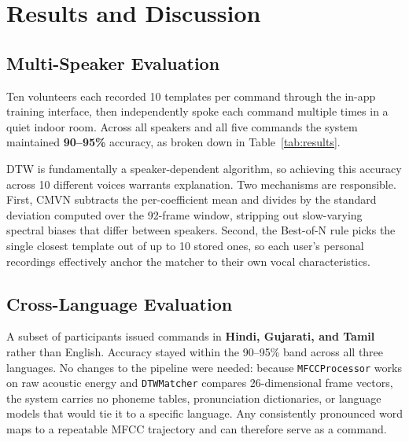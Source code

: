 \documentclass[conference]{IEEEtran}
\begin{document}
	

	\section{Results and Discussion} \label{sec:results}
	
	
	\subsection{Multi-Speaker Evaluation}
	
	Ten volunteers each recorded 10 templates per command through the
	in-app training interface, then independently spoke each command
	multiple times in a quiet indoor room. Across all speakers and all
	five commands the system maintained \textbf{90--95\%} accuracy, as
	broken down in Table~\ref{tab:results}.
	
	
	
	DTW is fundamentally a speaker-dependent algorithm, so achieving this
	accuracy across 10 different voices warrants explanation. Two
	mechanisms are responsible. First, CMVN subtracts the per-coefficient mean and divides by the
	standard deviation computed over the 92-frame window, stripping out
	slow-varying spectral biases that differ between speakers. Second, the
	Best-of-N rule picks the single closest
	template out of up to 10 stored ones, so each user's personal
	recordings effectively anchor the matcher to their own vocal
	characteristics. 
	
	\subsection{Cross-Language Evaluation}
	
	A subset of participants issued commands in \textbf{Hindi, Gujarati,
		and Tamil} rather than English. Accuracy stayed within the 90--95\%
	band across all three languages. No changes to the pipeline were
	needed: because \texttt{MFCCProcessor} works on raw acoustic energy
	and \texttt{DTWMatcher} compares 26-dimensional frame vectors, the
	system carries no phoneme tables, pronunciation dictionaries, or
	language models that would tie it to a specific language. Any
	consistently pronounced word maps to a repeatable MFCC trajectory and
	can therefore serve as a command.
	
\end{document}
